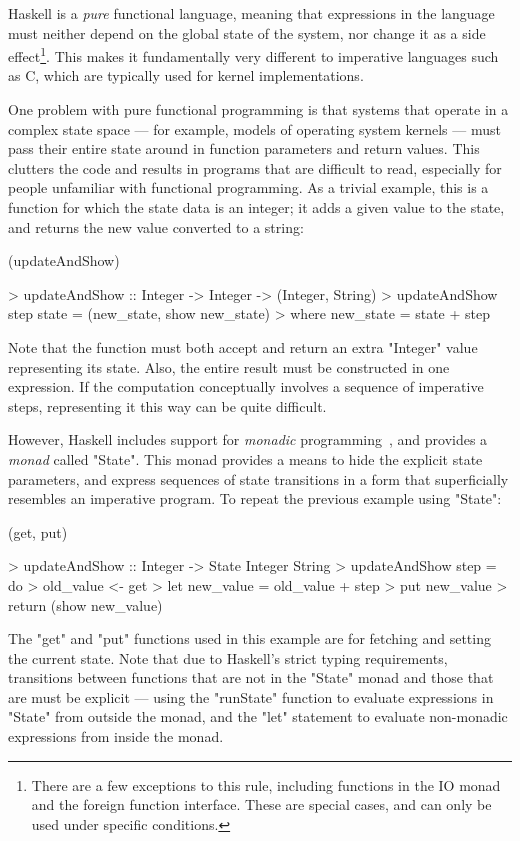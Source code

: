 Haskell is a \emph{pure} functional language, meaning that expressions in the language must neither depend on the global state of the system, nor change it as a side effect\footnote{There are a few exceptions to this rule, including functions in the {\hsfamily\scshape IO} monad and the foreign function interface. These are special cases, and can only be used under specific conditions.}. This makes it fundamentally very different to imperative languages such as C, which are typically used for kernel implementations.

One problem with pure functional programming is that systems that operate in a complex state space --- for example, models of operating system kernels --- must pass their entire state around in function parameters and return values. This clutters the code and results in programs that are difficult to read, especially for people unfamiliar with functional programming. As a trivial example, this is a function for which the state data is an integer; it adds a given value to the state, and returns the new value converted to a string:

\functions (updateAndShow)

> updateAndShow :: Integer -> Integer -> (Integer, String)
> updateAndShow step state = (new_state, show new_state)
>         where new_state = state + step

Note that the function must both accept and return an extra "Integer" value representing its state. Also, the entire result must be constructed in one expression. If the computation conceptually involves a sequence of imperative steps, representing it this way can be quite difficult.

However, Haskell includes support for \emph{monadic} programming~\cite{wadler92essence}, and provides a \emph{monad} called "State". This monad provides a means to hide the explicit state parameters, and express sequences of state transitions in a form that superficially resembles an imperative program. To repeat the previous example using "State":

\functions (get, put)

> updateAndShow :: Integer -> State Integer String
> updateAndShow step = do
>         old_value <- get
>         let new_value = old_value + step
>         put new_value
>         return (show new_value)

The "get" and "put" functions used in this example are for fetching and setting the current state. Note that due to Haskell's strict typing requirements, transitions between functions that are not in the "State" monad and those that are must be explicit --- using the "runState" function to evaluate expressions in "State" from outside the monad, and the "let" statement to evaluate non-monadic expressions from inside the monad.

